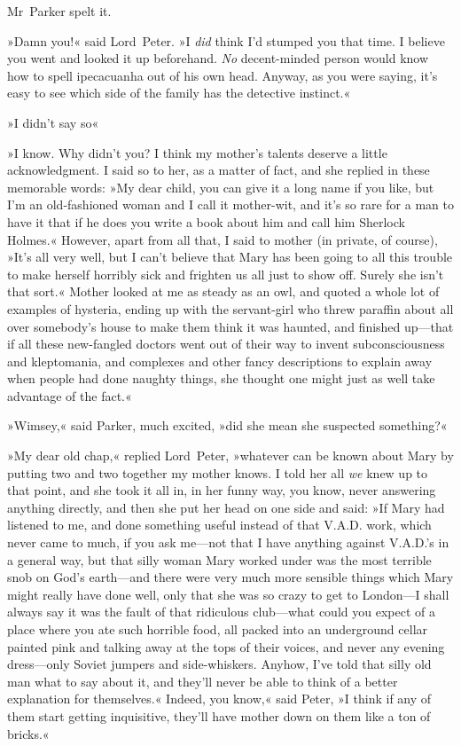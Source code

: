 Mr~Parker spelt it.

»Damn you!« said Lord~Peter. »I \textit{did} think I'd stumped you that time.  I believe you went and looked it up beforehand. \textit{No} decent-minded person would know how to spell ipecacuanha out of his own head. Anyway, as you were saying, it's easy to see which side of the family has the detective instinct.«

»I didn't say so\longdash«

»I know. Why didn't you? I think my mother's talents deserve a little acknowledgment. I said so to her, as a matter of fact, and she replied in these memorable words: »My dear child, you can give it a long name if you like, but I'm an old-fashioned woman and I call it mother-wit, and it's so rare for a man to have it that if he does you write a book about him and call him Sherlock Holmes.« However, apart from all that, I said to mother (in private, of course), »It's all very well, but I can't believe that Mary has been going to all this trouble to make herself horribly sick and frighten us all just to show off. Surely she isn't that sort.« Mother looked at me as steady as an owl, and quoted a whole lot of examples of hysteria, ending up with the servant-girl who threw paraffin about all over somebody's house to make them think it was haunted, and finished up—that if all these new-fangled doctors went out of their way to invent subconsciousness and kleptomania, and complexes and other fancy descriptions to explain away when people had done naughty things, she thought one might just as well take advantage of the fact.«

»Wimsey,« said Parker, much excited, »did she mean she suspected something?«

»My dear old chap,« replied Lord~Peter, »whatever can be known about Mary by putting two and two together my mother knows. I told her all \textit{we} knew up to that point, and she took it all in, in her funny way, you know, never answering anything directly, and then she put her head on one side and said: »If Mary had listened to me, and done something useful instead of that V.A.D. work, which never came to much, if you ask me—not that I have anything against V.A.D.'s in a general way, but that silly woman Mary worked under was the most terrible snob on God's earth—and there were very much more sensible things which Mary might really have done well, only that she was so crazy to get to London—I shall always say it was the fault of that ridiculous club—what could you expect of a place where you ate such horrible food, all packed into an underground cellar painted pink and talking away at the tops of their voices, and never any evening dress—only Soviet jumpers and side-whiskers. Anyhow, I've told that silly old man what to say about it, and they'll never be able to think of a better explanation for themselves.« Indeed, you know,« said Peter, »I think if any of them start getting inquisitive, they'll have mother down on them like a ton of bricks.«


